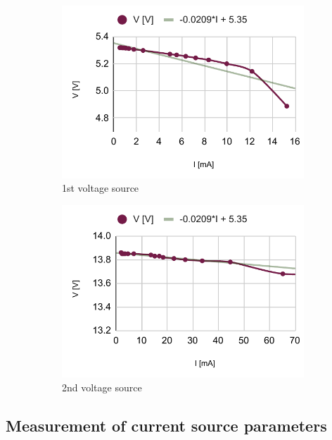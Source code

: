 \begin{figure}[H]
	\centering
	\begin{subfigure}{.5\textwidth}
		\centering
		\includegraphics[width=.99\linewidth]{schematics/chart3.pdf}
		\caption{1st voltage source}
	\end{subfigure}%
	\begin{subfigure}{.5\textwidth}
		\centering
		\includegraphics[width=.99\linewidth]{schematics/chart4.pdf}
		\caption{2nd voltage source}
	\end{subfigure}
	\caption{}
\end{figure}


\subsection{Measurement of current source parameters}


